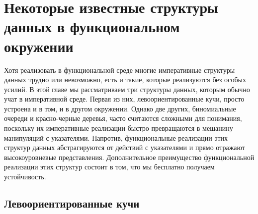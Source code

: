 \chapter{Некоторые известные структуры данных в функциональном
  окружении}
\label{ch:3}

Хотя реализовать в функциональной среде многие императивные структуры
данных трудно или невозможно, есть и такие, которые реализуются без
особых усилий.  В этой главе мы рассматриваем три структуры данных,
которым обычно учат в императивной среде. Первая из них,
левоориентированные кучи, просто устроена и в том, и в другом
окружении. Однако две других, биномиальные очереди и красно-черные
деревья, часто считаются сложными для понимания, поскольку
их императивные реализации быстро превращаются в мешанину манипуляций
с указателями.  Напротив, функциональные реализации этих структур
данных абстрагируются от действий с указателями и прямо отражают
высокоуровневые представления. Дополнительное преимущество
функциональной реализации этих структур состоит в том, что мы
бесплатно получаем устойчивость.

\section{Левоориентированные кучи}
\label{sc:3.1}

